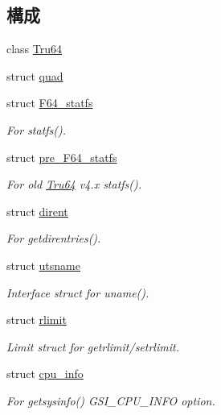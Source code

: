 \subsection*{構成}
\begin{DoxyCompactItemize}
\item 
class \hyperlink{classTru64}{Tru64}
\item 
struct \hyperlink{structTru64_1_1quad}{quad}
\item 
struct \hyperlink{structTru64_1_1F64__statfs}{F64\_\-statfs}
\begin{DoxyCompactList}\small\item\em For statfs(). \item\end{DoxyCompactList}\item 
struct \hyperlink{structTru64_1_1pre__F64__statfs}{pre\_\-F64\_\-statfs}
\begin{DoxyCompactList}\small\item\em For old \hyperlink{classTru64}{Tru64} v4.x statfs(). \item\end{DoxyCompactList}\item 
struct \hyperlink{structTru64_1_1dirent}{dirent}
\begin{DoxyCompactList}\small\item\em For getdirentries(). \item\end{DoxyCompactList}\item 
struct \hyperlink{structTru64_1_1utsname}{utsname}
\begin{DoxyCompactList}\small\item\em Interface struct for uname(). \item\end{DoxyCompactList}\item 
struct \hyperlink{structTru64_1_1rlimit}{rlimit}
\begin{DoxyCompactList}\small\item\em Limit struct for getrlimit/setrlimit. \item\end{DoxyCompactList}\item 
struct \hyperlink{structTru64_1_1cpu__info}{cpu\_\-info}
\begin{DoxyCompactList}\small\item\em For getsysinfo() GSI\_\-CPU\_\-INFO option. \item\end{DoxyCompactList}\item 

\end{DoxyCompactItemize}
